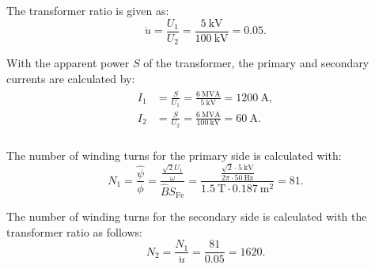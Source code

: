\begin{solutionblock}
  The transformer ratio is given as:
  \begin{equation}
    \ddot{u} = \frac{U_{\mathrm{1}}}{U_{\mathrm{2}}}
    = \frac{\SI{5}{\kilo \volt}}{\SI{100}{\kilo \volt}}
    = 0.05.
  \end{equation}

  With the apparent power $S$ of the transformer, the primary and secondary currents are calculated by:
  \begin{align}
    \begin{split}
      I_{\mathrm{1}} &= \frac{S}{U_{\mathrm{1}}}
      = \frac{\SI{6}{\mega \volt \ampere}}{\SI{5}{\kilo \volt}}
      = \SI{1200}{\ampere}, \\
      I_{\mathrm{2}} &= \frac{S}{U_{\mathrm{2}}}
      = \frac{\SI{6}{\mega \volt \ampere}}{\SI{100}{\kilo \volt}}
      = \SI{60}{\ampere}. \\
    \end{split}
  \end{align}

\end{solutionblock}




\begin{solutionblock}
  
  The number of winding turns for the primary side is calculated with:
  \begin{equation}
    N_{\mathrm{1}} = \frac{\hat{\psi}}{\phi}
    = \frac{\frac{\sqrt{2}U_{\mathrm{1}}}{\omega}}{\hat{B} S_{\mathrm{Fe}}}
    = \frac{\frac{\sqrt{2} \cdot \SI{5}{\kilo\volt}}{2\pi \cdot \SI{50}{\hertz}}}{\SI{1.5}{\tesla} \cdot \SI{0.187}{\metre^2}}
    = 81.
    \end{equation}

    The number of winding turns for the secondary side is calculated with the transformer ratio as follows:
    \begin{equation}
      N_{\mathrm{2}} = \frac{N_{\mathrm{1}}}{\ddot{u}}
      = \frac{81}{0.05}
      = 1620.
    \end{equation}
\end{solutionblock}



